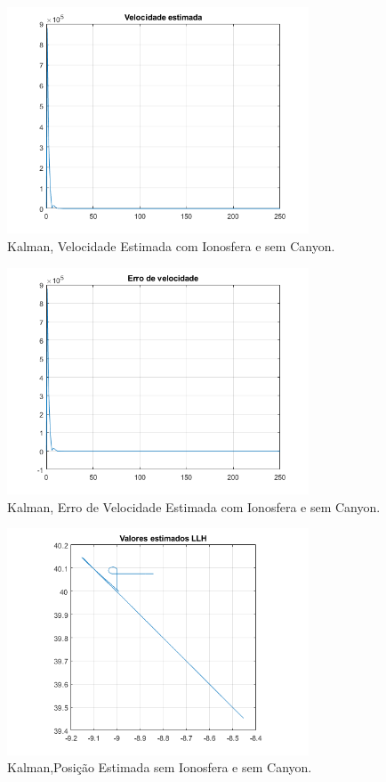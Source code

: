 \documentclass[palatino]{ist-report}
\begin{document}
\begin{figure}[ht]
	\centering
	\includegraphics[width=0.8\textwidth]{kalman_3/2-3-velocidade_estimada.png}
	\caption{Kalman, Velocidade Estimada com Ionosfera e sem Canyon.}
	\label{Velocidade23}
\end{figure}


\begin{figure}[ht]
	\centering
	\includegraphics[width=0.8\textwidth]{kalman_3/2-3-erro_velocidade.png}
	\caption{Kalman, Erro de Velocidade Estimada com Ionosfera e sem Canyon.}
	\label{eVelocidade23}
\end{figure}

\begin{figure}[ht]
	\centering
	\includegraphics[width=0.8\textwidth]{kalman_4/2-4-plot_posicao_estimada_LLH.png}
	\caption{Kalman,Posição Estimada sem Ionosfera e sem Canyon.}
	\label{Posicao24}
\end{figure}
\end{document}
